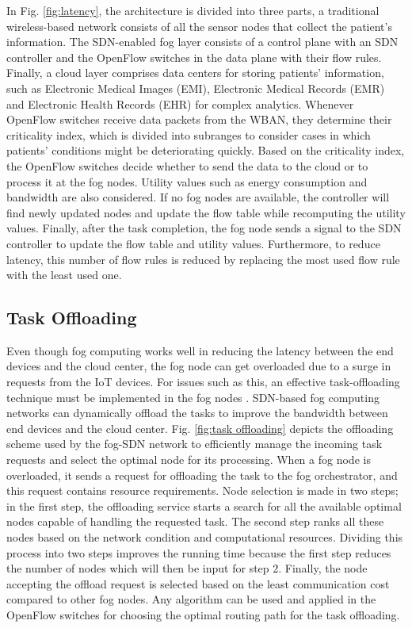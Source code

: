 \documentclass[conference]{IEEEtran}
\begin{document}
In Fig. \ref{fig:latency}, the architecture is divided into three parts, a traditional wireless-based network consists of all the sensor nodes that collect the patient's information. The SDN-enabled fog layer consists of a control plane with an SDN controller and the OpenFlow switches in the data plane with their flow rules. Finally, a cloud layer comprises data centers for storing patients' information, such as Electronic Medical Images (EMI), Electronic Medical Records (EMR) and Electronic Health Records (EHR) for complex analytics. Whenever OpenFlow switches receive data packets from the WBAN, they determine their criticality index, which is divided into subranges to consider cases in which patients' conditions might be deteriorating quickly. Based on the criticality index, the OpenFlow switches decide whether to send the data to the cloud or to process it at the fog nodes. Utility values such as energy consumption and bandwidth are also considered. If no fog nodes are available, the controller will find newly updated nodes and update the flow table while recomputing the utility values. Finally, after the task completion, the fog node sends a signal to the SDN controller to update the flow table and utility values. Furthermore, to reduce latency, this number of flow rules is reduced by replacing the most used flow rule with the least used one.


\subsection{Task Offloading}
Even though fog computing works well in reducing the latency between the end devices and the cloud center, the fog node can get overloaded due to a surge in requests from the IoT devices. For issues such as this, an effective task-offloading technique must be implemented in the fog nodes \cite{phan}. SDN-based fog computing networks can dynamically offload the tasks to improve the bandwidth between end devices and the cloud center. Fig. \ref{fig:task offloading} depicts the offloading scheme used by the fog-SDN network to efficiently manage the incoming task requests and select the optimal node for its processing. When a fog node is overloaded, it sends a request for offloading the task to the fog orchestrator, and this request contains resource requirements. Node selection is made in two steps; in the first step, the offloading service starts a search for all the available optimal nodes capable of handling the requested task. The second step ranks all these nodes based on the network condition and computational resources. Dividing this process into two steps improves the running time because the first step reduces the number of nodes which will then be input for step 2. Finally, the node accepting the offload request is selected based on the least communication cost compared to other fog nodes. Any algorithm can be used and applied in the OpenFlow switches for choosing the optimal routing path for the task offloading.
\end{document}
